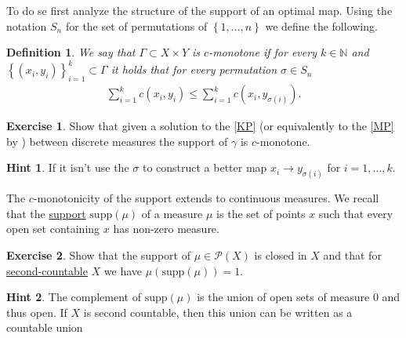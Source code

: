 \documentclass[
    a4paper,
    DIV=14,
    abstract=true,
    numbers=noenddot
]
{scrartcl}
\newtheorem{definition}[definition]{Definition}
\theoremstyle{definition}
\newtheorem{exercise}{Exercise}
\newtheorem*{hint}{Hint}
\newcommand{\set}[1]{\left\{#1\right\}}
\newcommand{\rmm}[1]{\mathrm{#1}}
\newcommand{\N}{\mathbb{N}}
\newcommand{\Pp}{\mathcal{P}}
\begin{document}
To do se first analyze the structure of the support of an optimal map. Using the notation $S_n$ for the set of permutations of $\set{1,\ldots,n}$ we define the following.
\begin{definition}
    We say that $\Gamma  \subset X \times Y$ is $c$-monotone if for every  $k \in \N$ and $\set{(x_i,y_i)}_{i=1}^k \subset \Gamma $ it holds that for every permutation $\sigma \in S_n$
    \begin{align*}
        \sum_{i=1}^k c(x_i,y_i) \leq \sum_{i=1}^{k} c(x_i,y_{\sigma(i)}).
    \end{align*}
\end{definition}
\begin{exercise}\label{ex:discrete transport is c-monotone}
    Show that given a solution to the \eqref{KP} (or equivalently to the \eqref{MP} by ) between  discrete measures the support of $\gamma $ is $c$-monotone.
\end{exercise}
\begin{hint}
    If it isn't use the $\sigma $ to construct a better map $x_i \to y_{\sigma(i)}$ for $i=1,...,k$.
\end{hint}
The $c$-monotonicity of the support extends to continuous measures. We recall that the \href{https://en.wikipedia.org/wiki/Support_(measure_theory)}{support} $\rmm{supp}(\mu )$ of a measure $\mu $  is the set of points $x$  such that every open set containing $x$ has non-zero measure.
\begin{exercise}\label{ex:supp}
    Show that the support of $\mu \in \Pp(X)$ is closed in $X$ and that for \href{https://en.wikipedia.org/wiki/Second-countable_space}{second-countable} $X$ we have $\mu(\rmm{supp}(\mu ))=1 $.
\end{exercise}
\begin{hint}
    The complement of $\rmm{supp}(\mu )$ is the union of open sets of measure $0$ and thus open. If $X$ is second countable, then this union can be written as a countable union
\end{hint}
\end{document}
